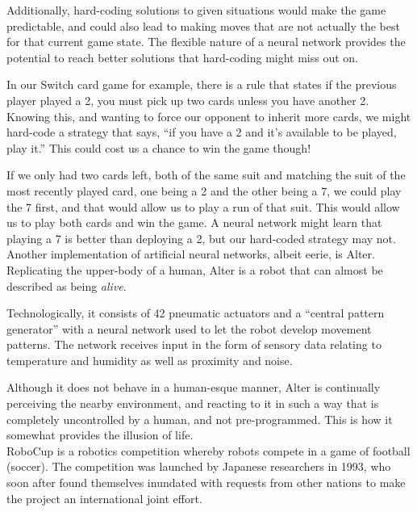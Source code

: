 \documentclass[12pt,a4paper]{article}
\begin{document}
Additionally, hard-coding solutions to given situations would make the game predictable, and could also lead to making moves that are not actually the best for that current game state. The flexible nature of a neural network provides the potential to reach better solutions that hard-coding might miss out on. 

In our Switch card game for example, there is a rule that states if the previous player played a 2, you must pick up two cards unless you have another 2. Knowing this, and wanting to force our opponent to inherit more cards, we might hard-code a strategy that says, \enquote{if you have a 2 and it's available to be played, play it.} This could cost us a chance to win the game though! 

If we only had two cards left, both of the same suit and matching the suit of the most recently played card, one being a 2 and the other being a 7, we could play the 7 first, and that would allow us to play a run of that suit. This would allow us to play both cards and win the game. A neural network might learn that playing a 7 is better than deploying a 2, but our hard-coded strategy may not.\\


Another implementation of artificial neural networks, albeit eerie, is Alter\citep{21}. Replicating the upper-body of a human, Alter is a robot that can almost be described as being \textit{alive}. 

Technologically, it consists of 42 pneumatic actuators and a \enquote{central pattern generator} with a neural network used to let the robot develop movement patterns\citep{21}. The network receives input in the form of sensory data relating to temperature and humidity as well as proximity and noise\citep{22}. 

Although it does not behave in a human-esque manner, Alter is continually perceiving the nearby environment, and reacting to it in such a way that is completely uncontrolled by a human, and not pre-programmed. This is how it somewhat provides the illusion of life. \\


RoboCup\citep{23} is a robotics competition whereby robots compete in a game of football (soccer). The competition was launched by Japanese researchers in 1993, who soon after found themselves inundated with requests from other nations to make the project an international joint effort\citep{23}. 
\end{document}
